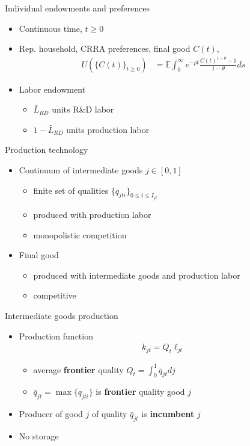 \documentclass[english,usenames,dvipsnames]{beamer}
\begin{document}
\begin{frame}{Individual endowments and preferences}
	\begin{itemize}
		\item Continuous time, $t \ge 0$
		\item Rep. household, CRRA preferences, final good $C(t)$,
		\begin{align*}
		U(\{C(t)\}_{t \ge 0}) &= \mathbb{E} \int_0^{\infty} e^{-\rho t} \frac{C(t)^{1-\theta} - 1}{1 - \theta} ds
		\end{align*}
		\item Labor endowment
		\begin{itemize}
			\item $\bar{L}_{RD}$ units R\&D labor
			\item $1 - \bar{L}_{RD}$ units production labor
		\end{itemize}
	\end{itemize}
\end{frame}

\begin{frame}{Production technology}
	\begin{itemize}
		\item Continuum of intermediate goods $j \in [0,1]$ 
		\begin{itemize}
			\item finite set of qualities $\{q_{jti}\}_{0 \le i \le I_{jt}}$
			\item produced with production labor 
			\item monopolistic competition
		\end{itemize}
		\smallskip
		\item Final good
		\begin{itemize}
			\item produced with intermediate goods and production labor
			\item competitive
		\end{itemize}
	\end{itemize}
\end{frame}

\begin{frame}{Intermediate goods production}\label{intermediate_goods_production}
	\begin{itemize}
		\item Production function
		\begin{align*}
		k_{jt} = Q_t \ell_{jt}
		\end{align*}
		\begin{itemize}
			\item average \alert{\textbf{frontier}} quality $Q_t = \int_0^1 \bar{q}_{jt} dj$
			\item $\bar{q}_{jt} = \max \{q_{jti}\}$ is \alert{\textbf{frontier}} quality good $j$
		\end{itemize}
		\medskip
		\item Producer of good $j$ of quality $\bar{q}_{jt}$ is \alert{\textbf{incumbent}} $j$
		\medskip
		\item No storage
	\end{itemize}
\end{frame}
\end{document}
